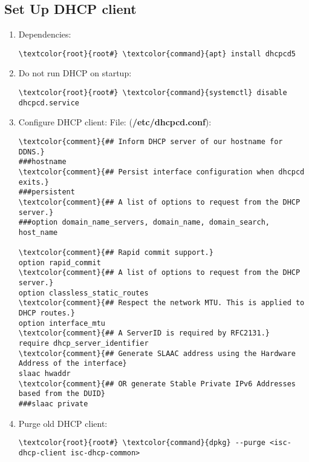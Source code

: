 \documentclass[10pt, a4paper, onecolumn, openany]{book} %
\begin{document}
\subsection{Set Up DHCP client}
\begin{enumerate}
    \item Dependencies:
\begin{Verbatim}[commandchars=\\\{\}]
\textcolor{root}{root#} \textcolor{command}{apt} install dhcpcd5
\end{Verbatim}
    \item Do not run DHCP on startup:
\begin{Verbatim}[commandchars=\\\{\}]
\textcolor{root}{root#} \textcolor{command}{systemctl} disable dhcpcd.service
\end{Verbatim}
    \item Configure DHCP client:
\newline File: (\textbf{\textcolor{file}{/etc/dhcpcd.conf}}):
\begin{Verbatim}[commandchars=\\\{\}]
\textcolor{comment}{## Inform DHCP server of our hostname for DDNS.}
###hostname
\textcolor{comment}{## Persist interface configuration when dhcpcd exits.}
###persistent
\textcolor{comment}{## A list of options to request from the DHCP server.}
###option domain_name_servers, domain_name, domain_search, host_name

\textcolor{comment}{## Rapid commit support.}
option rapid_commit
\textcolor{comment}{## A list of options to request from the DHCP server.}
option classless_static_routes
\textcolor{comment}{## Respect the network MTU. This is applied to DHCP routes.}
option interface_mtu
\textcolor{comment}{## A ServerID is required by RFC2131.}
require dhcp_server_identifier
\textcolor{comment}{## Generate SLAAC address using the Hardware Address of the interface}
slaac hwaddr
\textcolor{comment}{## OR generate Stable Private IPv6 Addresses based from the DUID}
###slaac private
\end{Verbatim}
    \item Purge old DHCP client:
\begin{Verbatim}[commandchars=\\\{\}]
\textcolor{root}{root#} \textcolor{command}{dpkg} --purge <isc-dhcp-client isc-dhcp-common>
\end{Verbatim}
\end{enumerate}
\end{document}
